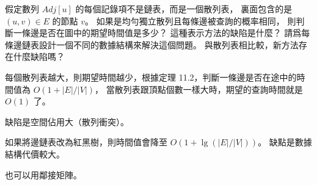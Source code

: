 \startEXERCISE
假定數列 $Adj[u]$ 的每個記錄項不是鏈表，而是一個散列表，
裏面包含的是 $(u,v)\in E$ 的節點 $v$。
如果是均勻獨立散列且每條邊被查詢的概率相同，
則判斷一條邊是否在圖中的期望時間值是多少？
這種表示方法的缺陷是什麼？
請爲每條邊鏈表設計一個不同的數據結構來解決這個問題。
與散列表相比較，新方法存在什麼缺陷嗎？
\stopEXERCISE

\startANSWER
每個散列表越大，則期望時間越少，根據定理 11.2，判斷一條邊是否在途中的時間值為 $O(1+|E|/|V|)$，
當散列表跟頂點個數一樣大時，期望的查詢時間就是 $O(1)$ 了。

缺陷是空間佔用大（散列衝突）。

如果將邊鏈表改為紅黑樹，則時間值會降至 $O(1+\lg(|E|/|V|))$。
缺點是數據結構代價較大。

也可以用鄰接矩陣。
\stopANSWER

